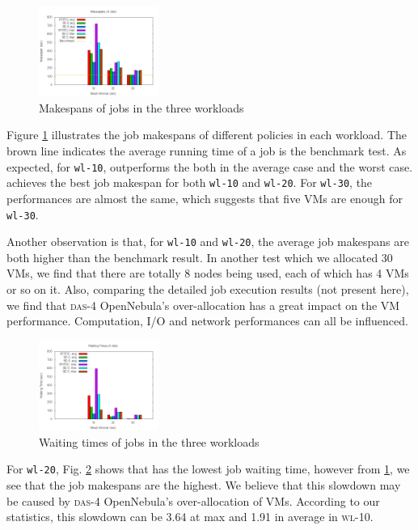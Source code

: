 \begin{figure}[!t]
\centering
\includegraphics[width=0.35\textwidth]{pictures/all-makespans.png}
\caption{Makespans of jobs in the three workloads}
\label{figure_jobmakespan}
\end{figure}

Figure \ref{figure_jobmakespan} illustrates the job makespans of different
policies in each workload. The brown line indicates the average running time
of a job is the benchmark test. As expected, for \texttt{wl-10},
\SE{} outperforms the \STATIC{} both in the average case
and the worst case. \SEfive{} achieves the best job makespan for both
\texttt{wl-10} and \texttt{wl-20}. For \texttt{wl-30}, the performances are
almost the same, which suggests that five VMs are enough for \texttt{wl-30}.

Another observation is that, for \texttt{wl-10} and \texttt{wl-20},
the average job makespans are both higher than the benchmark
result. In another test which we allocated 30 VMs, we find that there
are totally 8 nodes being used, each of which has 4 VMs or so on
it. Also, comparing the detailed job execution results (not present
here), we find that \textsc{das-4} OpenNebula's over-allocation has a
great impact on the VM performance. Computation, I/O and network
performances can all be influenced.

\begin{figure}[!t]
\centering
\includegraphics[width=0.35\textwidth]{pictures/all-waittimes.png}
\caption{Waiting times of jobs in the three workloads}
\label{figure_jobwaittime}
\end{figure}

For \texttt{wl-20}, Fig. \ref{figure_jobwaittime} shows that \SEzero{}
has the lowest job waiting time, however from
\ref{figure_jobmakespan}, we see that the job makespans are the
highest. We believe that this slowdown may be caused by \textsc{das-4}
OpenNebula's over-allocation of VMs. According to our statistics, this
slowdown can be 3.64 at max and 1.91 in average in \textsc{wl-10}.

